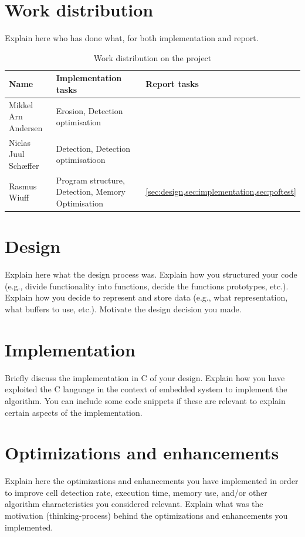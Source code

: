 \documentclass[a4paper, english]{article}
\numberwithin{equation}{section}
\begin{document}
\section{Work distribution}
Explain here who has done what, for both implementation and report.
\begin{table}[H]
    \centering
    \caption{Work distribution on the project}\label{tbl:ansvar}
    \begin{tabular}{lll}
        \toprule
        Name                 & Implementation tasks                              & Report tasks                                     \\
        \midrule
        Mikkel Arn Andersen  & Erosion, Detection optimisation                   &                                                  \\
        Niclas Juul Schæffer & Detection, Detection optimisatioon                &                                                  \\
        Rasmus Wiuff         & Program structure, Detection, Memory Optimisation & \cref{sec:design,sec:implementation,sec:poftest} \\
        \bottomrule
    \end{tabular}
\end{table}
\section{Design}\label{sec:design}
Explain here what the design process was. Explain how you structured your code (e.g., divide functionality into functions, decide the functions prototypes, etc.). Explain how you decide to represent and store data (e.g., what representation, what buffers to use, etc.). Motivate the design decision you made.
\section{Implementation}\label{sec:implementation}
Briefly discuss the implementation in C of your design. Explain how you have exploited the C language in the context of embedded system to implement the algorithm. You can include some code snippets if these are relevant to explain certain aspects of the implementation.
\section{Optimizations and enhancements}
Explain here the optimizations and enhancements you have implemented in order to improve cell detection rate, execution time, memory use, and/or other algorithm characteristics you considered relevant. Explain what was the motivation (thinking-process) behind the optimizations and enhancements you implemented.
\end{document}
